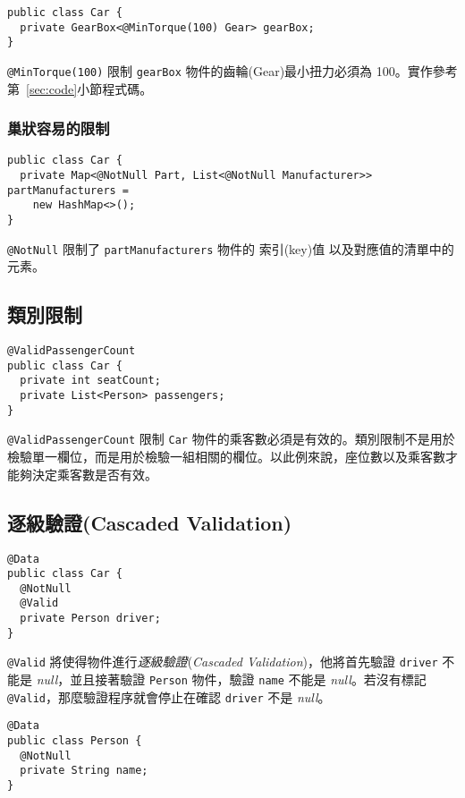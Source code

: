 \begin{lstlisting}
public class Car {
  private GearBox<@MinTorque(100) Gear> gearBox;
}
\end{lstlisting}

\texttt{@MinTorque(100)} 限制 \texttt{gearBox} 物件的齒輪(Gear)最小扭力必須為 100。實作參考第~\ref{sec:code}小節程式碼。

\subsubsection{巢狀容易的限制}

\begin{lstlisting}
public class Car {
  private Map<@NotNull Part, List<@NotNull Manufacturer>> partManufacturers =
    new HashMap<>();
}
\end{lstlisting}

\texttt{@NotNull} 限制了 \texttt{partManufacturers} 物件的 索引(key)值 以及對應值的清單中的元素。

\subsection{類別限制}

\begin{lstlisting}
@ValidPassengerCount
public class Car {
  private int seatCount;
  private List<Person> passengers;
}
\end{lstlisting}

\texttt{@ValidPassengerCount} 限制 \texttt{Car} 物件的乘客數必須是有效的。類別限制不是用於檢驗單一欄位，而是用於檢驗一組相關的欄位。以此例來說，座位數以及乘客數才能夠決定乘客數是否有效。

\subsection{逐級驗證(Cascaded Validation)}

\begin{lstlisting}
@Data
public class Car {
  @NotNull
  @Valid
  private Person driver;
}
\end{lstlisting}

\texttt{@Valid} 將使得物件進行\textit{逐級驗證}(\textit{Cascaded Validation})，他將首先驗證 \texttt{driver} 不能是 \textit{null}，並且接著驗證 \texttt{Person} 物件，驗證 \texttt{name} 不能是 \textit{null}。若沒有標記 \texttt{@Valid}，那麼驗證程序就會停止在確認 \texttt{driver} 不是 \textit{null}。

\begin{lstlisting}
@Data
public class Person {
  @NotNull
  private String name;
}
\end{lstlisting}

